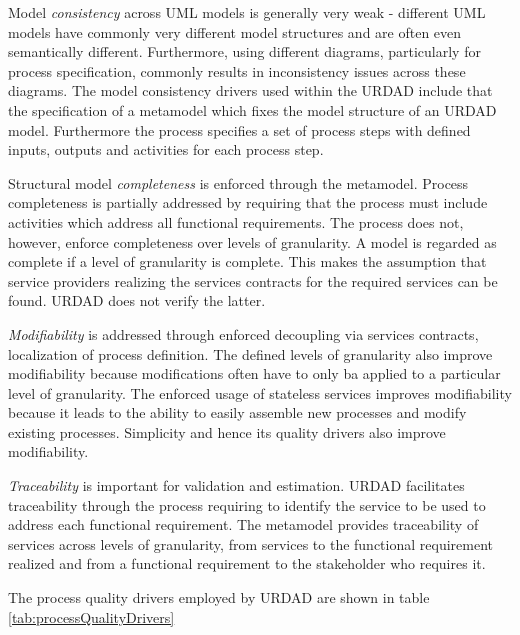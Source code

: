Model \emph{consistency} across UML models is generally very weak - different UML models have commonly very different model structures and are often even semantically different. Furthermore, using different diagrams, particularly for process specification, commonly results in inconsistency issues across these diagrams. The model consistency drivers used within the URDAD include that the specification of a metamodel which fixes the model structure of an URDAD model. Furthermore the process specifies a set of process steps with defined inputs, outputs and activities for each process step.

Structural model \emph{completeness} is enforced through the metamodel. Process completeness is partially addressed by requiring that the process must include activities which address all functional requirements. The process does not, however, enforce completeness over levels of granularity. A model is regarded as complete if a level of granularity is complete. This makes the assumption that service providers realizing the services contracts for the required services can be found. URDAD does not verify the latter.

\emph{Modifiability} is addressed through enforced decoupling via services contracts, localization of process definition. The defined levels of granularity also improve modifiability because modifications often have to only ba applied to a particular level of granularity. The enforced usage of stateless services improves modifiability because it leads to the ability to easily assemble new processes and modify existing processes. Simplicity and hence its quality drivers also improve modifiability.

\emph{Traceability} is important for validation and estimation. URDAD facilitates traceability through the process requiring to identify the service to be used to address each functional requirement. The metamodel provides traceability of services across levels of granularity,  from services to the functional requirement realized and from a functional requirement to the stakeholder who requires it.

The process quality drivers employed by URDAD are shown in table \ref{tab:processQualityDrivers}

